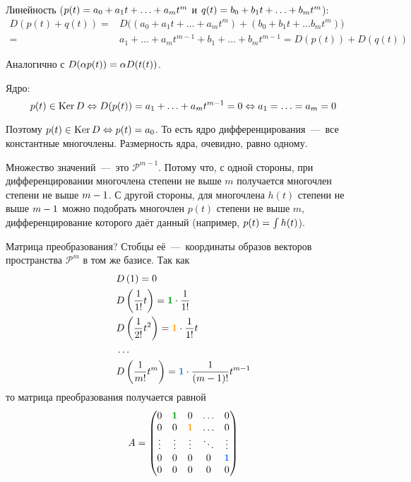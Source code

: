 \documentclass[a4paper,12pt]{article}
\begin{document}
  \begin{solution}
    Линейность ($p(t) \hm= a_0 \hm+ a_1 t \hm+ \ldots \hm+ a_m t^m$ и $q(t) \hm= b_0 \hm+ b_1 t \hm+ \ldots \hm+ b_m t^m$):
    \begin{equation*}
    \begin{split}
      D(p(t) + q(t)) = &D\bigl((a_0 + a_1 t + \ldots + a_m t^m) + (b_0 + b_1 t + \ldots b_m t^m)\bigr)\\
      = &a_1 + \ldots + a_m t^{m - 1} + b_1 + \ldots + b_m t^{m - 1}
      = D(p(t)) + D(q(t))
    \end{split}
    \end{equation*}
    
    Аналогично с $D(\alpha p(t)) \hm= \alpha D(t(t))$.
    
    Ядро:
    \[
      p(t) \in \operatorname{Ker} D \Leftrightarrow D(p(t)) = a_1 + \ldots + a_m t^{m - 1} = 0 \Leftrightarrow a_1 = \ldots = a_m = 0
    \]
    
    Поэтому $p(t) \in \Ker D \hm\Leftrightarrow p(t) \hm= a_0$.
    То есть ядро дифференцирования~---~все константные многочлены.
    Размерность ядра, очевидно, равно одному.
    
    Множество значений~---~это $\mathcal P^{m - 1}$.
    Потому что, с одной стороны, при дифференцировании многочлена степени не выше $m$ получается многочлен степени не выше $m \hm- 1$.
    С другой стороны, для многочлена $h(t)$ степени не выше $m \hm- 1$ можно подобрать многочлен $p(t)$ степени не выше $m$, дифференцирование которого даёт данный (например, $p(t) \hm= \int h(t)$).
    
    Матрица преобразования?
    Стобцы её~---~координаты образов векторов пространства $\mathcal P^m$ в том же базисе.
    Так как
    \[
      \begin{aligned}
        &D\left(1\right) = 0\\
        &D\left(\frac{1}{1!} t\right) = \textcolor{green}{\bds 1} \cdot \frac{1}{1!}\\
        &D\left(\frac{1}{2!} t^2\right) = \textcolor{orange}{\bds 1} \cdot \frac{1}{1!} t\\
        &\ldots\\
        &D\left(\frac{1}{m!} t^m\right) = \textcolor{blue}{\bds 1} \cdot \frac{1}{(m - 1)!} t^{m - 1}
      \end{aligned}
    \]
    то матрица преобразования получается равной
    \[
      A = \begin{pmatrix}
        0      & \textcolor{green}{\bds 1} & 0                          & \ldots & 0\\
        0      & 0                         & \textcolor{orange}{\bds 1} & \ldots & 0\\
        \vdots & \vdots                    & \vdots                     & \ddots & \vdots\\
        0      & 0                         & 0                          & 0      & \textcolor{blue}{\bds 1}\\
        0      & 0                         & 0                          & 0      & 0
      \end{pmatrix}
    \]
    

\end{solution}
\end{document}
